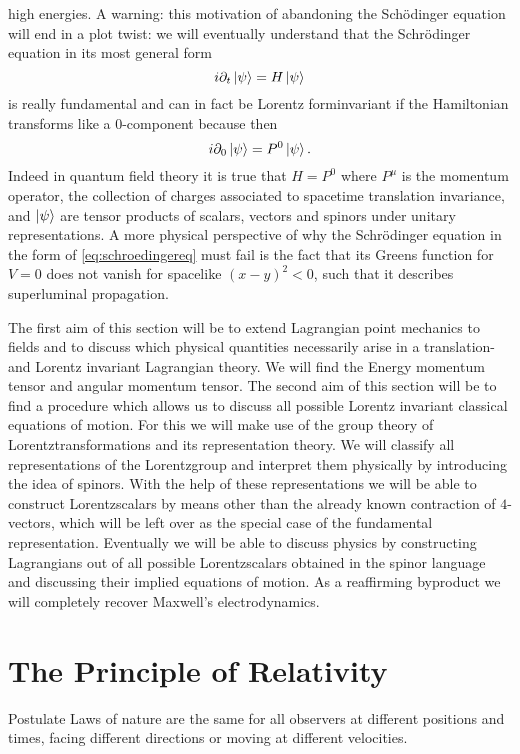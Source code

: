high energies. A warning: this motivation of abandoning the Schödinger equation will end in a plot
twist: we will eventually understand that the Schrödinger equation in its most general form
\begin{equation}
i \partial_t \ket{\psi} = H \ket{\psi}
\end{equation}
is really fundamental and can in fact be Lorentz forminvariant if the Hamiltonian transforms like
a $0$-component because then
\begin{equation}
i \partial_0 \ket{\psi} = P^0 \ket{\psi}.
\end{equation}
Indeed in quantum field theory it is true that $H = P^0$ where $P^\mu$ is the momentum operator, the
collection of charges associated to spacetime translation invariance, and $\ket{\psi}$ are tensor products
of scalars, vectors and spinors under unitary representations. A more physical perspective of why
the Schrödinger equation in the form of \ref{eq:schroedingereq} must fail is the fact that its Greens function for $V = 0$ does not vanish for spacelike $(x − y)^2 < 0$, such that it describes superluminal propagation.


The first aim of this section will be to extend Lagrangian point mechanics to fields and to discuss which physical quantities necessarily arise in a translation- and Lorentz invariant Lagrangian theory. We will find the Energy momentum tensor and angular momentum tensor.
The second aim of this section will be to find a procedure which allows us to discuss all possible
Lorentz invariant classical equations of motion. For this we will make use of the group theory of
Lorentztransformations and its representation theory. We will classify all representations of the
Lorentzgroup and interpret them physically by introducing the idea of spinors. With the help of
these representations we will be able to construct Lorentzscalars by means other than the already
known contraction of $4$-vectors, which will be left over as the special case of the fundamental representation. Eventually we will be able to discuss physics by constructing Lagrangians out of all
possible Lorentzscalars obtained in the spinor language and discussing their implied equations of
motion. As a reaffirming byproduct we will completely recover Maxwell’s electrodynamics.

\section{The Principle of Relativity}
\begin{mybox}{Postulate}
	Laws of nature are the same for all observers
	at different positions and times, facing different directions or moving at different velocities.
\end{mybox}
